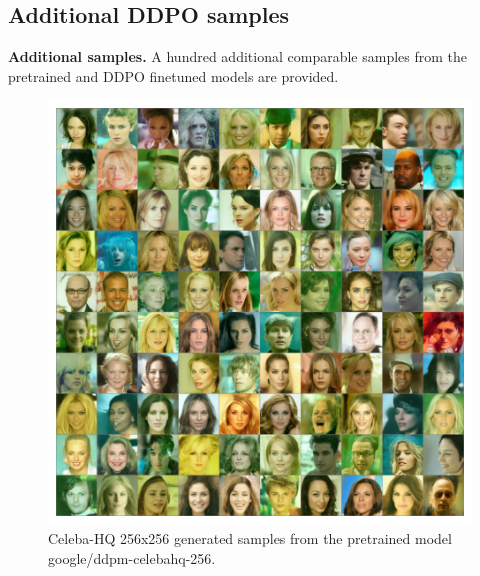 \begin{appendixs}
	
	\section{Additional DDPO samples}\label{appendix:additional-samples}

    \textbf{Additional samples.} A hundred additional comparable samples from the pretrained and DDPO finetuned models are provided.

        \begin{figure}[ht]
            \centering
            \includegraphics[scale=0.75]{img/results/ddpm-samples.png}
            \vspace{-4pt}  %
            \captionsetup{width=\textwidth} %
            \caption{Celeba-HQ 256x256 generated samples from the pretrained model google/ddpm-celebahq-256.}
            \label{fig:ddpm-samples}
        \end{figure}


\end{appendixs}
